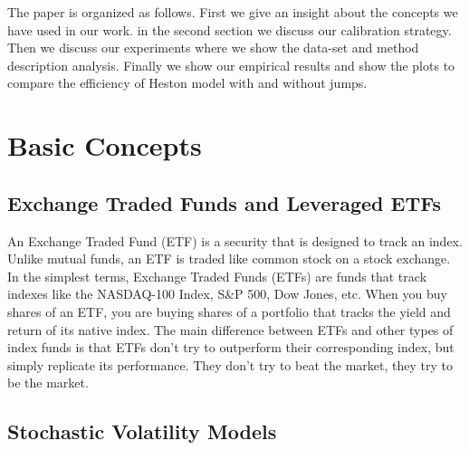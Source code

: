 \documentclass{article}
\begin{document}
The paper is organized as follows. First we give an insight about the concepts we have used in our work. in the second section we discuss our calibration strategy. Then we discuss our experiments where we show the data-set and method description analysis. Finally we show our empirical results and show the plots to compare the efficiency of Heston model with and without jumps.

\section{Basic Concepts}
\subsection{Exchange Traded Funds and Leveraged ETFs}
An Exchange Traded Fund (ETF) is a security that is designed to track an index. Unlike mutual funds, an ETF is traded like common stock on a stock exchange.\citep{ref2} In the simplest terms, Exchange Traded Funds (ETFs) are funds that track indexes like the NASDAQ-100 Index, S&P 500, Dow Jones, etc. When you buy shares of an ETF, you are buying shares of a portfolio that tracks the yield and return of its native index. The main difference between ETFs and other types of index funds is that ETFs don't try to outperform their corresponding index, but simply replicate its performance. They don't try to beat the market, they try to be the market.\citep{ref4}


\subsection{Stochastic Volatility Models}
\end{document}
